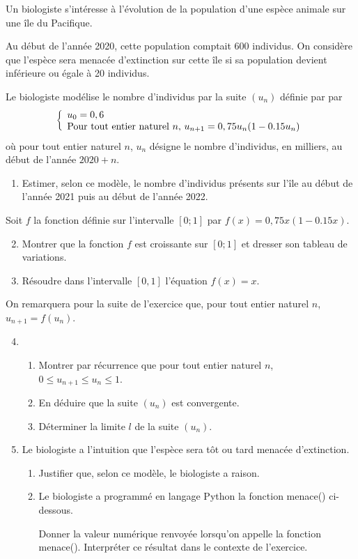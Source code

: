 \documentclass[11pt,fleqn, openany]{book} %
\begin{document}
\begin{exercise}[topic=cont02, subtitle={(Amérique du Nord 2021)}]Un biologiste s'intéresse à l'évolution de la population d'une espèce animale sur une île du Pacifique.

Au début de l'année 2020, cette population comptait 600 individus. On considère que l'espèce sera menacée d'extinction sur cette île si sa population devient inférieure ou égale à 20 individus.

Le biologiste modélise le nombre d'individus par la suite $(u_n)$
définie par par\[\left\{\renewcommand{\arraystretch}{1}\begin{array}{ll}u_0=0,6\\ \text{Pour tout entier naturel }n,\, u_{n+1}=0,75u_n(1-0.15u_n)\end{array}\right.\]
où pour tout entier naturel $n$, $u_n$ désigne le nombre d'individus, en milliers, au début de l'année $2020+n$.
\begin{enumerate}
\item Estimer, selon ce modèle, le nombre d'individus présents sur l'île au début de l'année 2021 puis au début de l'année 2022.
\end{enumerate}
Soit $f$ la fonction définie sur l'intervalle $[0;1]$ par $f(x)=0,75x(1-0.15x)$.
\begin{enumerate}
\setcounter{enumi}{1}
\item  Montrer que la fonction $f$ est croissante sur $[0;1]$ et dresser son tableau de variations.
\item Résoudre dans l'intervalle $[0,1]$ l'équation $f(x)=x$.
\end{enumerate}
On remarquera pour la suite de l'exercice que, pour tout entier naturel $n$, $u_{n+1}=f(u_n)$.
\begin{enumerate}
\setcounter{enumi}{3}
\item \begin{enumerate}
\item Montrer par récurrence que pour tout entier naturel $n$, $0\leqslant u_{n+1} \leqslant u_n \leqslant 1$.
\item En déduire que la suite $(u_n)$ est convergente.
\item Déterminer la limite $l$ de la suite $(u_n)$.
\end{enumerate}
\item Le biologiste a l'intuition que l'espèce sera tôt ou tard menacée d'extinction.
\begin{enumerate}
\item Justifier que, selon ce modèle, le biologiste a raison.
\item Le biologiste a programmé en langage Python la fonction menace() ci-dessous.




Donner la valeur numérique renvoyée lorsqu'on appelle la fonction menace().
Interpréter ce résultat dans le contexte de l'exercice.
\end{enumerate}
\end{enumerate}
\newpage
\end{exercise}
\end{document}
